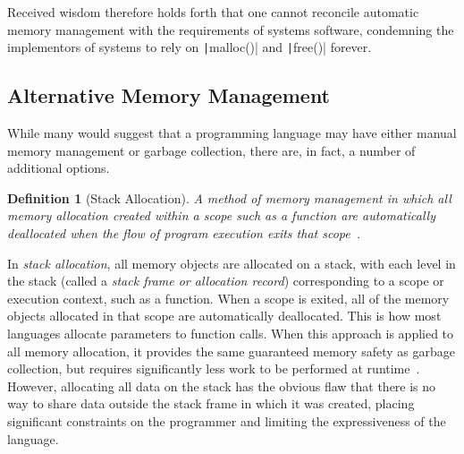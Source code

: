 \documentclass[11pt,a4paper]{article}
\theoremstyle{break}
\newtheorem{defn}{Definition}
\begin{document}
Received wisdom therefore holds forth that one cannot reconcile automatic memory management with the requirements of systems software, condemning the implementors of systems to rely on \texttt|malloc()| and \texttt|free()| forever.

\subsection{Alternative Memory Management}

While many would suggest that a programming language may have either manual memory management or garbage collection, there are, in fact, a number of additional options.

\begin{defn}[Stack Allocation]
A method of memory management in which all memory allocation created within a scope such as a function are automatically deallocated when the flow of program execution exits that scope~\cite{Corry:2006:OSA:1133956.1133978,Hanson:1990:ESA:91556.91603}.
\end{defn}

In \textit{stack allocation}, all memory objects are allocated on a stack, with each level in the stack (called a \textit{stack frame or \textit{allocation record}}) corresponding to a scope or execution context, such as a function. When a scope is exited, all of the memory objects allocated in that scope are automatically deallocated. This is how most languages allocate parameters to function calls. When this approach is applied to all memory allocation, it provides the same guaranteed memory safety as garbage collection, but requires significantly less work to be performed at runtime~\cite{Corry:2006:OSA:1133956.1133978,Hanson:1990:ESA:91556.91603}. However, allocating all data on the stack has the obvious flaw that there is no way to share data outside the stack frame in which it was created, placing significant constraints on the programmer and limiting the expressiveness of the language.
\end{document}
